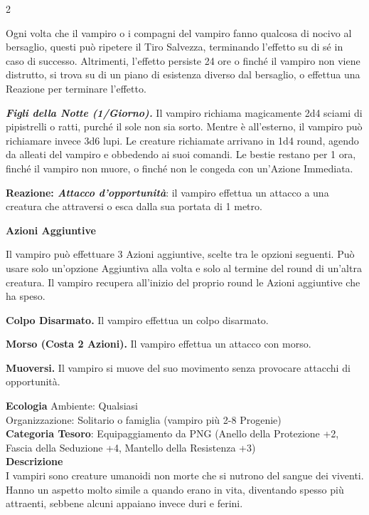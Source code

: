 \begin{multicols}{2}
{Ogni volta che il vampiro o i compagni del vampiro fanno qualcosa di nocivo al bersaglio, questi può ripetere il Tiro Salvezza, terminando l'effetto su di sé in caso di successo. Altrimenti, l'effetto persiste 24 ore o finché il vampiro non viene distrutto, si trova su di un piano di esistenza diverso dal bersaglio, o effettua una Reazione per terminare l'effetto.

\emph{\textbf{Figli della Notte (1/Giorno).}} Il vampiro richiama magicamente 2d4 sciami di pipistrelli o ratti, purché il sole non sia sorto. Mentre è all'esterno, il vampiro può richiamare invece 3d6 lupi. Le creature richiamate arrivano in 1d4 round, agendo da alleati del vampiro e obbedendo ai suoi comandi. Le bestie restano per 1 ora, finché il vampiro non muore, o finché non le congeda con un'Azione Immediata.

\textbf{Reazione: \emph{Attacco d'opportunità}}: il vampiro effettua un attacco a una creatura che attraversi o esca dalla sua portata di 1 metro.

\textbf{Azioni Aggiuntive}

Il vampiro può effettuare 3 Azioni aggiuntive, scelte tra le opzioni seguenti. Può usare solo un'opzione Aggiuntiva alla volta e solo al termine del round di un'altra creatura. Il vampiro recupera all'inizio del proprio round le Azioni aggiuntive che ha speso.

\textbf{Colpo Disarmato.} Il vampiro effettua un colpo disarmato.

\textbf{Morso (Costa 2 Azioni).} Il vampiro effettua un attacco con morso.

\textbf{Muoversi.} Il vampiro si muove del suo movimento senza provocare attacchi di opportunità.

\textbf{Ecologia}
Ambiente: Qualsiasi\\
Organizzazione: Solitario o famiglia (vampiro più 2-8 Progenie)\\
\textbf{Categoria Tesoro}: Equipaggiamento da PNG (Anello della Protezione +2, Fascia della Seduzione +4, Mantello della Resistenza +3)\\
\textbf{Descrizione}\\
I vampiri sono creature umanoidi non morte che si nutrono del sangue dei viventi. Hanno un aspetto molto simile a quando erano in vita, diventando spesso più attraenti, sebbene alcuni appaiano invece duri e ferini.

}
\end{multicols}
